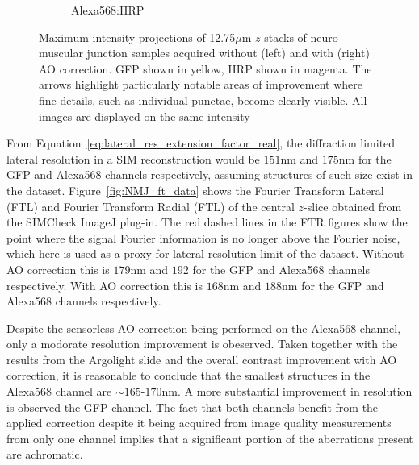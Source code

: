 \begin{figure}
\begin{subfigure}[t]{0.24\textwidth}
		\caption{Alexa568:HRP}
		\label{fig:DeepSIM_NMJ_AO_ROI2_Alexa568}
	\end{subfigure}
	\caption[\textit{Drosophila} neuro-muscular junction 
	data acquired on the DeepSIM imaging system]{Maximum intensity 
	projections of 12.75$\mu$m $z$-stacks of neuro-muscular junction 
	samples acquired without (left) and with (right) AO correction. GFP 
	shown in yellow, HRP shown in magenta. The arrows highlight 
	particularly notable areas of improvement where fine details, such as 
	individual punctae, become clearly visible. All images are displayed on the same intensity}
	\label{fig:DeepSIM_NMJ_data}
\end{figure}

From Equation~\ref{eq:lateral_res_extension_factor_real}, the diffraction 
limited lateral resolution in a SIM reconstruction would be $151$nm and 
$175$nm for the GFP and Alexa568 channels respectively, assuming structures 
of such size exist in the dataset. Figure~\ref{fig:NMJ_ft_data} shows the 
Fourier Transform Lateral (FTL) and Fourier Transform Radial (FTL) of the 
central $z$-slice obtained from the SIMCheck ImageJ 
plug-in\cite{ball2015simcheck}. The red dashed lines in the FTR figures 
show the point where the signal Fourier information is no longer above the 
Fourier noise, which here is used as a proxy for lateral resolution limit 
of the dataset. Without AO correction this is $179$nm and $192$ for the GFP 
and Alexa568 channels respectively. With AO correction this is $168$nm and 
$188$nm for the GFP and Alexa568 channels respectively. 

Despite the sensorless AO correction being performed on the Alexa568 
channel, only a modorate resolution improvement is obeserved. Taken 
together with the results from the Argolight slide and the overall contrast 
improvement with AO correction, it is reasonable to conclude that the 
smallest structures in the Alexa568 channel are $\sim165$-$170$nm. A more 
substantial improvement in resolution is observed the GFP channel. The fact 
that both channels benefit from the applied correction despite it being 
acquired from image quality measurements from only one channel implies that 
a significant portion of the aberrations present are achromatic.

